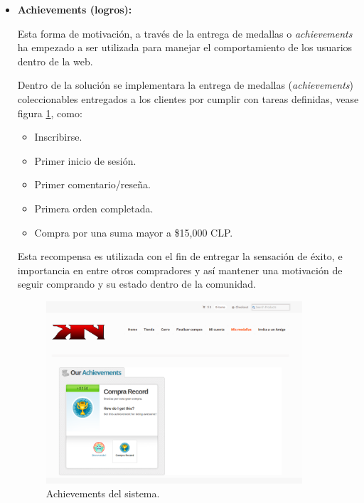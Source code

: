 \begin{itemize}
    \item {\bf Achievements (logros):}

	Esta forma de motivación, a través de la entrega de medallas o \emph{achievements}
	ha empezado a ser utilizada para manejar el comportamiento de los
	usuarios dentro de la web\cite{BehaviorBadges}.

        Dentro de la solución se implementara la entrega de medallas (\emph{achievements})
	coleccionables entregados a los clientes por cumplir con tareas definidas, vease
	figura \ref{fig:achievement}, como:

        \begin{itemize}
            \item Inscribirse.
            \item Primer inicio de sesión.
            \item Primer comentario/reseña.
            \item Primera orden completada.
            \item Compra por una suma mayor a \$15,000 CLP.
        \end{itemize}

        Esta recompensa es utilizada con el fin de entregar la sensación de éxito,
        e importancia en entre otros compradores y así mantener una motivación
        de seguir comprando y su estado dentro de la comunidad.

\begin{figure}[!htb]
  \centering
  \includegraphics[width=0.9\textwidth]{images/Tienda/Tienda_achievement.png}
  \caption[Achievement]{Achievements del sistema.}
  \label{fig:achievement}
\end{figure}




\end{itemize}
